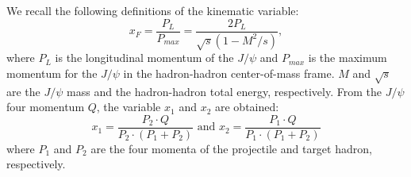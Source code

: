 \documentclass[reprint,aps,unsortedaddress,superscriptaddress,prd,floatfix,showpacs,linenumbers]{revtex4-2}
\begin{document}
We recall the following definitions of the kinematic variable:
\begin{equation}
	x_F = \frac{P_L}{P_{max}}=\frac{2P_L}{\sqrt{s}\left(1-M^2/s\right)},
\end{equation}
where $P_L$ is the longitudinal momentum of the $J/\psi$ and $P_{max}$ is
the maximum momentum for the $J/\psi$ in the hadron-hadron center-of-mass
frame. $M$ and $\sqrt{s}$ are the $J/\psi$ mass and the hadron-hadron total energy,
respectively. From the $J/\psi$ four momentum $Q$, the variable $x_1$ and $x_2$
are obtained:
\begin{equation}
	x_1=\frac{P_2\cdot Q}{P_2 \cdot \left(P_1 + P_2\right)} \textrm{ and } x_2=\frac{P_1\cdot Q}{P_1 \cdot \left(P_1 + P_2\right)}
\end{equation}
where $P_1$ and $P_2$ are the four momenta of the projectile and target hadron,
respectively.
\end{document}
